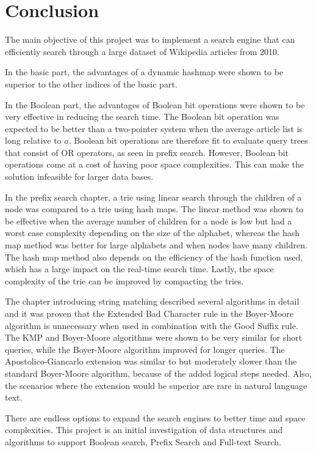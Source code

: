 \chapter{Conclusion}

The main objective of this project was to implement a search engine that can efficiently search through a large dataset of Wikipedia articles from 2010. 

In the basic part, the advantages of a dynamic hashmap were shown to be superior to the other indices of the basic part.
 
In the Boolean part, the advantages of Boolean bit operations were shown to be very effective in reducing the search time. The Boolean bit operation was expected to be better than a two-pointer system when the average article list is long relative to $a$. Boolean bit operations are therefore fit to evaluate query trees that consist of OR operators, as seen in prefix search. However, Boolean bit operations come at a cost of having poor space complexities. This can make the solution infeasible for larger data bases. 

In the prefix search chapter, a trie using linear search through the children of a node was compared to a trie using hash maps. The linear method was shown to be effective when the average number of children for a node is low but had a worst case complexity depending on the size of the alphabet, whereas the hash map method was better for large alphabets and when nodes have many children. The hash map method also depends on the efficiency of the hash function used, which has a large impact on the real-time search time. Lastly, the space complexity of the trie can be improved by compacting the tries. 

The chapter introducing string matching described several algorithms in detail and it was proven that the Extended Bad Character rule in the Boyer-Moore algorithm is unnecessary when used in combination with the Good Suffix rule. The KMP and Boyer-Moore algorithms were shown to be very similar for short queries, while the Boyer-Moore algorithm improved for longer queries. The Apostolico-Giancarlo extension was similar to but moderately slower than the standard Boyer-Moore algorithm, because of the added logical steps needed. Also, the scenarios where the extension would be superior are rare in natural language text. 

There are endless options to expand the search engines to better time and space complexities. This project is an initial investigation of data structures and algorithms to support Boolean search, Prefix Search and Full-text Search. 
